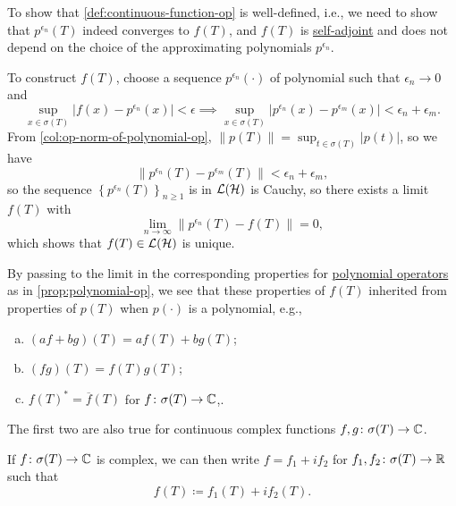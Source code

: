 \begin{note}
	To show that \autoref{def:continuous-function-op} is well-defined, i.e., we need to show that \(p^{\epsilon _n}(T)\) indeed converges to \(f(T)\), and \(f(T)\) is \hyperref[def:self-adjoint-op]{self-adjoint} and does not depend on the choice of the approximating polynomials \(p^{\epsilon _n}\).
\end{note}
\begin{explanation}
	To construct \(f(T)\), choose a sequence \(p^{\epsilon _n}(\cdot)\) of polynomial such that \(\epsilon _n \to 0\) and
	\[
		\sup _{x\in \sigma (T)} \vert f(x) - p^{\epsilon _n}(x)  \vert < \epsilon
		\implies \sup _{x\in \sigma (T)} \vert p^{\epsilon _n}(x) - p^{\epsilon _m}(x) \vert < \epsilon _n + \epsilon _m.
	\]
	From \autoref{col:op-norm-of-polynomial-op}, \(\lVert p(T) \rVert = \sup _{t\in \sigma (T)} \vert p(t) \vert \), so we have
	\[
		\lVert p^{\epsilon _n}(T) - p^{\epsilon _m}(T) \rVert < \epsilon _n + \epsilon _m,
	\]
	so the sequence \(\left\{ p^{\epsilon _n}(T) \right\} _{n\geq 1}\) is in \(\mathcal{\MakeUppercase{l}} (\mathcal{\MakeUppercase{h}} )\) is Cauchy, so there exists a limit \(f(T)\) with
	\[
		\lim_{n \to \infty} \lVert p^{\epsilon _n}(T) - f(T) \rVert = 0,
	\]
	which shows that \(f(T)\in \mathcal{\MakeUppercase{l}} (\mathcal{\MakeUppercase{h}} )\) is unique.
\end{explanation}

By passing to the limit in the corresponding properties for \hyperref[def:polynomial-op]{polynomial operators} as in \autoref{prop:polynomial-op}, we see that these properties of \(f(T)\) inherited from properties of \(p(T)\) when \(p(\cdot)\) is a polynomial, e.g.,
\begin{enumerate}[(a)]
	\item \((af + bg)(T) = af(T) + bg(T)\);
	\item \((fg)(T) = f(T) g(T)\);
	\item \(f(T)^{\ast} = \overline{f} (T)\) for \(f\colon \sigma (T) \to \mathbb{\MakeUppercase{c}}\),.
\end{enumerate}

\begin{note}
	The first two are also true for continuous complex functions \(f, g\colon \sigma (T) \to \mathbb{\MakeUppercase{c}} \).
\end{note}
\begin{explanation}
	If \(f\colon \sigma (T) \to  \mathbb{\MakeUppercase{c}} \) is complex, we can then write \(f = f_1 + if_2\) for \(f_1, f_2 \colon \sigma (T) \to \mathbb{\MakeUppercase{r}} \) such that
	\[
		f(T) \coloneqq f_1(T) + if_2(T).
	\]
\end{explanation}

